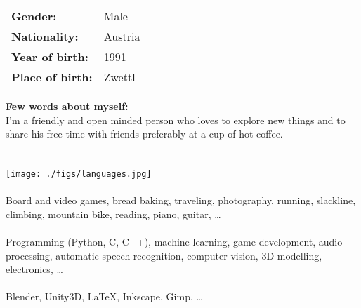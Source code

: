 


\begin{tabular} { l p{3.9cm} }
  \textbf{Gender:} & Male\\
  \textbf{Nationality:} & Austria\\
  \textbf{Year of birth:} & 1991\\
  \textbf{Place of birth:} & Zwettl\\
\end{tabular}

\textbf{Few words about myself:}\\
I'm a friendly and open minded person who loves to explore new things and to share his free time with friends preferably at a cup of hot coffee.\\


\\\\
\begingroup \centering \texttt{[image: ./figs/languages.jpg]} \endgroup\\



\\
Board and video games, bread baking, traveling, photography, running, slackline, climbing, mountain bike, reading, piano, guitar, \dots\\


\\
Programming (Python, C, C++), machine learning, game development, audio processing, automatic speech recognition, computer-vision, 3D modelling, electronics, \dots\\


\\
Blender, Unity3D, \LaTeX, Inkscape, Gimp, \dots